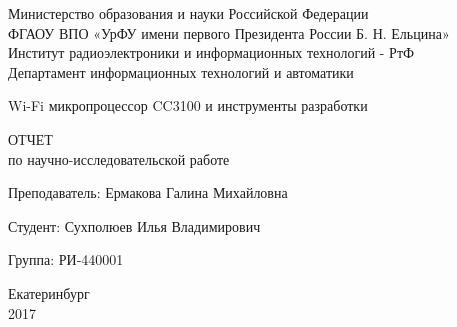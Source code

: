 \begin{center}
    Министерство образования и науки Российской Федерации\\
    ФГАОУ ВПО  «УрФУ имени первого Президента России Б. Н. Ельцина»\\
    Институт радиоэлектроники и информационных технологий - РтФ\\
    Департамент информационных технологий и автоматики
    \par
    \vspace{4.5cm}
    \Large{
      Wi-Fi микропроцессор CC3100 и инструменты разработки

      \par
      \vspace{0.5cm}

      ОТЧЕТ\\
      по научно-исследовательской работе
    }

    \vspace{4cm}
    {
      Преподаватель: \hfill Ермакова Галина Михайловна
    }
    \par
    {
      Студент: \hfill Сухполюев Илья Владимирович
    }
    \par
    {
      Группа: \hfill РИ-440001
    }

    \par
    \vspace{3.5cm}
    Екатеринбург\\
    2017
\end{center}
